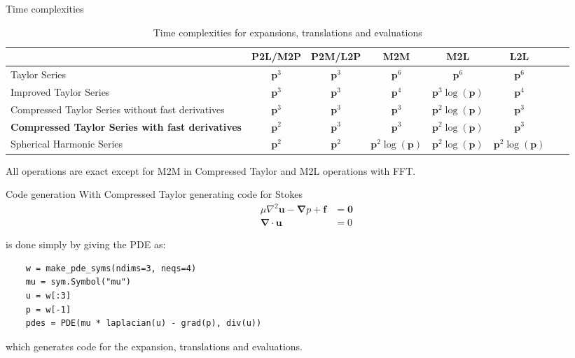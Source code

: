 \documentclass[10pt,usenames,dvipsnames]{beamer}
\def\b#1{\mathbf{ #1}}
\begin{document}
\begin{frame}[fragile]{Time complexities}

\renewcommand{\arraystretch}{2} 
 \begin{table}[]
 \scriptsize
 \begin{tabular}{|m{12em}|c|c|c|c|c|c|c|}
 \hline                          & P2L/M2P      & P2M/L2P   & M2M          & M2L            & L2L      \\ \hline
 Taylor Series                   & \color{NavyBlue} $\b  p^3$    &\color{NavyBlue} $\b p^3$ &\color{NavyBlue} $\b p^{6}$      &\color{NavyBlue} $\b p^{6}$        &\color{NavyBlue} $\b p^{6}$   \\ \hline
 Improved Taylor Series          & \color{NavyBlue} $\b  p^3$    &\color{NavyBlue} $\b p^3$ &\color{NavyBlue} $\b p^{4}$      &\color{NavyBlue} $\b p^{3} \log( \b p)$        &\color{NavyBlue} $\b p^{4}$   \\ \hline
     Compressed Taylor Series without fast derivatives          &\color{NavyBlue} $\b p^3$    &\color{NavyBlue} $\b p^3$ &\color{NavyBlue} $\b p^{3}$      &\color{Green} $\b p^{2} \log(\b p)$ & \color{NavyBlue}$\b p^{3}$   \\ \hline
 \textbf{Compressed Taylor Series with fast derivatives}
                                 &\color{Green} $\b p^{2}$  & \color{NavyBlue} $\b p^3$ &\color{NavyBlue} $\b p^{3}$      &\color{Green} $\b p^2 \log(\b p)$   &\color{NavyBlue} $\b p^{3}$   \\ \hline
 Spherical Harmonic Series       &\color{Green} $\b p^2$    &\color{Green} $\b p^2$ &\color{Green} $\b p^2\log(\b p)$ &\color{Green} $\b p^2\log(\b p)$   &\color{Green} $\b p^2\log(\b p)$   \\ \hline
 \end{tabular}
   \caption{Time complexities for expansions, translations and evaluations} \label{tab:compressed}
 \end{table}
All operations are exact except for M2M in Compressed Taylor and M2L operations with FFT.

\end{frame}

\begin{frame}[fragile]{Code generation}
 With Compressed Taylor generating code for Stokes
 \begin{align*} \mu \nabla^2 \mathbf{u} -\boldsymbol{\nabla}p + \mathbf{f} &= \boldsymbol{0} \\
 \boldsymbol{\nabla}\cdot\mathbf{u}&= 0 \end{align*}

 is done simply by giving the PDE as:
 
 \begin{verbatim}
    w = make_pde_syms(ndims=3, neqs=4)
    mu = sym.Symbol("mu")
    u = w[:3]
    p = w[-1]
    pdes = PDE(mu * laplacian(u) - grad(p), div(u))
 \end{verbatim}
 which generates code for the expansion, translations and evaluations.

\end{frame}
\end{document}
